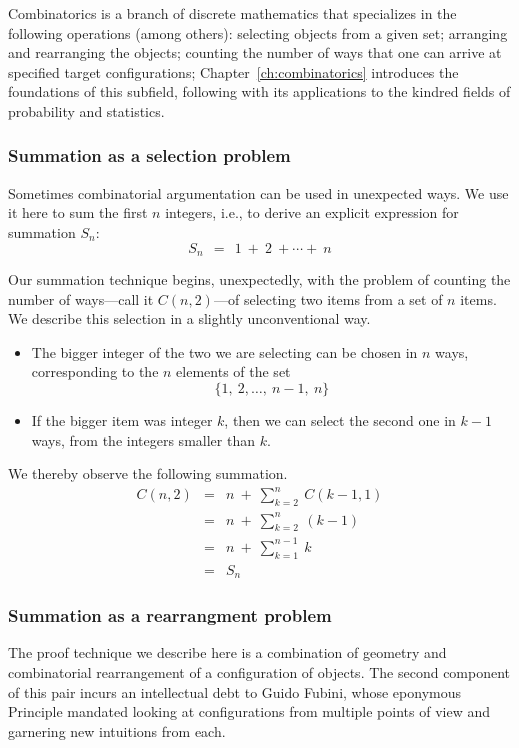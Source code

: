 Combinatorics is a branch of discrete mathematics that specializes in
the following operations (among others): selecting objects from a
given set; arranging and rearranging the objects; counting the number
of ways that one can arrive at specified target configurations;
Chapter~\ref{ch:combinatorics} introduces the foundations of this
subfield, following with its applications to the kindred fields of
probability and statistics.

\subsubsection{Summation as a selection problem}
\label{sec:comb-sum-of-first-n}

Sometimes combinatorial argumentation can be used in unexpected ways.
We use it here to sum the first $n$ integers, i.e., to derive an
explicit expression for summation $S_n$:
\[ S_n \ \ = \ \ 1 \ + \ 2 \ + \cdots + \ n \]

Our summation technique begins, unexpectedly, with the problem of
counting the number of ways---call it $C(n,2)$---of selecting two
items from a set of $n$ items.  We describe this selection in a
slightly unconventional way.
\begin{itemize}
\item
The bigger integer of the two we are selecting can be chosen in $n$
ways, corresponding to the $n$ elements of the set
\[ \{ 1, \ 2, \ldots, \ n-1, \ n \} \]
\item
If the bigger item was integer $k$, then we can select the second one
in $k-1$ ways, from the integers smaller than $k$.
\end{itemize}
We thereby observe the following summation.
\begin{eqnarray*}
C(n,2) & = & n \ + \ \sum_{k=2}^n \ C(k-1,1) \\
       & = & n \ + \ \sum_{k=2}^n \ (k-1) \\
       & = & n \ + \ \sum_{k=1}^{n-1} \ k \\
       & = & S_n
\end{eqnarray*}

\subsubsection{Summation as a rearrangment problem}
\label{sec:summation-via-Fubini}

The proof technique we describe here is a combination of geometry and
combinatorial rearrangement of a configuration of objects.  The second
component of this pair incurs an intellectual debt to Guido Fubini,
 whose eponymous Principle 
mandated looking at configurations from multiple points of view and
garnering new intuitions from each.


